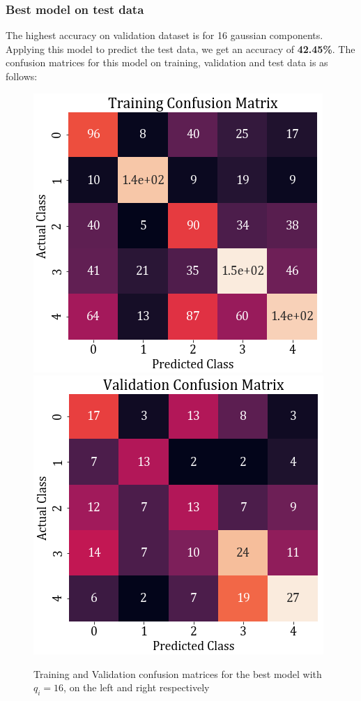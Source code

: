 \documentclass[11pt,a4paper]{article}
\begin{document}
\subsubsection{Best model on test data}
The highest accuracy on validation dataset is for 16 gaussian components. Applying this model to predict the test data, we get an accuracy of \textbf{42.45\%}. The confusion matrices for this model on training, validation and test data is as follows:
\begin{figure}[H]
    \centering
    \includegraphics[scale=0.5]{images/2A/2A_diag_train_conf.png}
    \includegraphics[scale=0.5]{images/2A/2A_diag_val_conf.png}
    \caption{Training and Validation confusion matrices for the best model with $q_i=16$, on the left and right respectively}
\end{figure}
\end{document}
